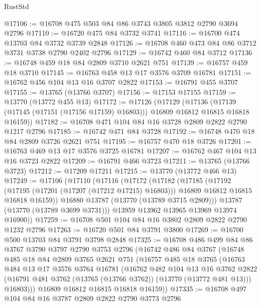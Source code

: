 \begin{lexlean}{RustStd}
\begin{coremodule}
@17106 := @16708 @475 @503 @84 @86 @3743 @3805 @3812 @2790 @3694 @2796
@17110 := @16720 @475 @84 @3732 @3741
@17116 := @16700 @474 @13703 @84 @3732 @3739 @2848
@17126 := @16708 @460 @473 @84 @86 @3712 @3731 @3738 @2790 @2402 @2796
@17129 := @16742 @460 @84 @3712
@17136 := @16748 @459 @18 @84 @2809 @3710 @2621 @751
@17139 := @16757 @459 @18 @3710
@17145 := @16763 @458 @13 @17 @3576 @3709 @16781
@17151 := @16762 @456 @104 @13 @16 @3707 @2822
@17153 := @16791 @455 @3707
@17155 := @13765 (@13766 @3707)
@17156 := @17153 @17155
@17159 := @13770 (@13772 @455 @13)
@17172 := @17126
    (@17129
      (@17136 (@17139 (@17145 (@17151 (@17156 @17159) @16803))) @16809 @16812 @16815 @16818 @16159))
@17182 := @16708 @471 @104 @84 @16 @3728 @2809 @2822 @2790 @1217 @2796
@17185 := @16742 @471 @84 @3728
@17192 := @16748 @470 @18 @84 @2809 @3726 @2621 @751
@17195 := @16757 @470 @18 @3726
@17201 := @16763 @469 @13 @17 @3576 @3725 @16781
@17207 := @16762 @467 @104 @13 @16 @3723 @2822
@17209 := @16791 @466 @3723
@17211 := @13765 (@13766 @3723)
@17212 := @17209 @17211
@17215 := @13770 (@13772 @466 @13)
@17249 := @17106
    (@17110
      (@17116
        (@17172
          (@17182
            (@17185
              (@17192
                (@17195 (@17201 (@17207 (@17212 @17215) @16803)))
                @16809
                @16812
                @16815
                @16818
                @16159))
            @16880
            @13787
            (@13770 (@13789 @3715 @2809)))
          @13787
          (@13770 (@13789 @3699 @3731)))
        @13959
        @13962
        @13965
        @13969
        @13974
        @16900))
@17259 := @16708 @501 @104 @84 @16 @3802 @2809 @2822 @2790 @1232 @2796
@17263 := @16720 @501 @84 @3791 @3800
@17269 := @16700 @500 @13703 @84 @3791 @3798 @2848
@17325 := @16708
    @486
    @499
    @84
    @86
    @3767
    @3790
    @3797
    @2790
    @3753
    @2796
    (@16742
      @486
      @84
      @3767
      (@16748
        @485
        @18
        @84
        @2809
        @3765
        @2621
        @751
        (@16757
          @485
          @18
          @3765
          (@16763
            @484
            @13
            @17
            @3576
            @3764
            @16781
            (@16762
              @482
              @104
              @13
              @16
              @3762
              @2822
              (@16791 @481 @3762 (@13765 (@13766 @3762)) (@13770 (@13772 @481 @13)))
              @16803)))
        @16809
        @16812
        @16815
        @16818
        @16159))
@17335 := @16708 @497 @104 @84 @16 @3787 @2809 @2822 @2790 @3773 @2796

\end{coremodule}
\end{lexlean}
